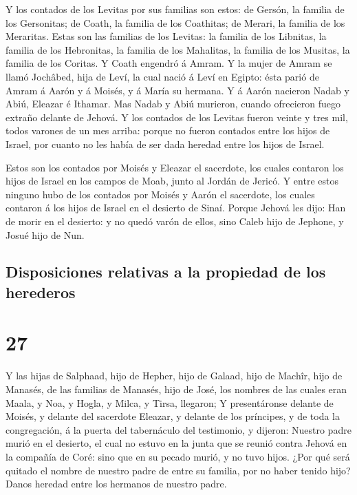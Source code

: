  Y los contados de los Levitas por sus familias son
estos: de Gersón, la familia de los Gersonitas; de Coath, la familia de
los Coathitas; de Merari, la familia de los Meraritas. 
Estas son las familias de los Levitas: la familia de los Libnitas, la
familia de los Hebronitas, la familia de los Mahalitas, la familia de
los Musitas, la familia de los Coritas. Y Coath engendró á Amram.
 Y la mujer de Amram se llamó Jochâbed, hija de Leví, la
cual nació á Leví en Egipto: ésta parió de Amram á Aarón y á Moisés, y á
María su hermana.  Y á Aarón nacieron Nadab y Abiú,
Eleazar é Ithamar.  Mas Nadab y Abiú murieron, cuando
ofrecieron fuego extraño delante de Jehová.  Y los
contados de los Levitas fueron veinte y tres mil, todos varones de un
mes arriba: porque no fueron contados entre los hijos de Israel, por
cuanto no les había de ser dada heredad entre los hijos de Israel.

 Estos son los contados por Moisés y Eleazar el
sacerdote, los cuales contaron los hijos de Israel en los campos de
Moab, junto al Jordán de Jericó.  Y entre estos ninguno
hubo de los contados por Moisés y Aarón el sacerdote, los cuales
contaron á los hijos de Israel en el desierto de Sinaí. 
Porque Jehová les dijo: Han de morir en el desierto: y no quedó varón de
ellos, sino Caleb hijo de Jephone, y Josué hijo de Nun.

\hypertarget{disposiciones-relativas-a-la-propiedad-de-los-herederos}{%
\subsection{Disposiciones relativas a la propiedad de los
herederos}\label{disposiciones-relativas-a-la-propiedad-de-los-herederos}}

\hypertarget{section-26}{%
\section{27}\label{section-26}}

 Y las hijas de Salphaad, hijo de Hepher, hijo de Galaad,
hijo de Machîr, hijo de Manasés, de las familias de Manasés, hijo de
José, los nombres de las cuales eran Maala, y Noa, y Hogla, y Milca, y
Tirsa, llegaron;  Y presentáronse delante de Moisés, y
delante del sacerdote Eleazar, y delante de los príncipes, y de toda la
congregación, á la puerta del tabernáculo del testimonio, y dijeron:
 Nuestro padre murió en el desierto, el cual no estuvo en
la junta que se reunió contra Jehová en la compañía de Coré: sino que en
su pecado murió, y no tuvo hijos.  ¿Por qué será quitado
el nombre de nuestro padre de entre su familia, por no haber tenido
hijo? Danos heredad entre los hermanos de nuestro padre.

